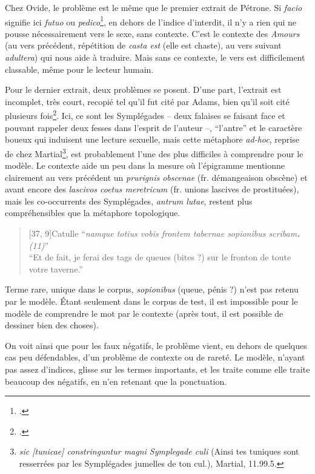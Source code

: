Chez Ovide, le problème est le même que le premier extrait de Pétrone. Si \textit{facio} signifie ici \textit{futuo} ou \textit{pedico}\footcite[p.204]{adams}, en dehors de l'indice d'interdit, il n'y a rien qui ne pousse nécessairement vers le sexe, sans contexte. C'est le contexte des \textit{Amours} (au vers précédent, répétition de \textit{casta est} (elle est chaste), au vers suivant \textit{adultera}) qui nous aide à traduire. Mais sans ce contexte, le vers est difficilement classable, même pour le lecteur humain.

Pour le dernier extrait, deux problèmes se posent. D'une part, l'extrait est incomplet, très court, recopié tel qu'il fut cité par Adams, bien qu'il soit cité plusieurs fois\footcite[pp.114, 172 et 240]{adams}. Ici, ce sont les Symplégades -- deux falaises se faisant face et pouvant rappeler deux fesses dans l'esprit de l'auteur --, \enquote{l'antre} et le caractère boueux qui induisent une lecture sexuelle, mais cette métaphore \textit{ad-hoc}, reprise de chez Martial\footnote{\textit{sic {[tunicae]} constringuntur magni Symplegade culi} (Ainsi tes tuniques sont resserrées par les Symplégades jumelles de ton cul.), Martial, 11.99.5.}, est probablement l'une des plus difficiles à comprendre pour le modèle. Le contexte aide un peu dans la mesure où l'épigramme mentionne clairement au vers précédent un \textit{prurignis obscenae} (fr. démangeaison obscène) et avant encore des \textit{lascivos coetus meretricum} (fr. unions lascives de prostituées), mais les co-occurrents des Symplégades, \textit{antrum lutae}, restent plus compréhensibles que la métaphore topologique.

\starbreak

\begin{quote}[37, 9]{Catulle}
    \enquote{\textit{namque totius vobis frontem tabernae sopionibus scribam\textbf{.} (11)}} \\
    \enquote{Et de fait, je ferai des tags de queues (bites ?) sur le fronton de toute votre taverne.}
\end{quote}

Terme rare, unique dans le corpus, \textit{sopionibus} (queue, pénis ?) n'est pas retenu par le modèle. Étant seulement dans le corpus de test, il est impossible pour le modèle de comprendre le mot par le contexte (après tout, il est possible de dessiner bien des choses).

On voit ainsi que pour les faux négatifs, le problème vient, en dehors de quelques cas peu défendables, d'un problème de contexte ou de rareté. Le modèle, n'ayant pas assez d'indices, glisse sur les termes importants, et les traite comme elle traite beaucoup des négatifs, en n'en retenant que la ponctuation.

